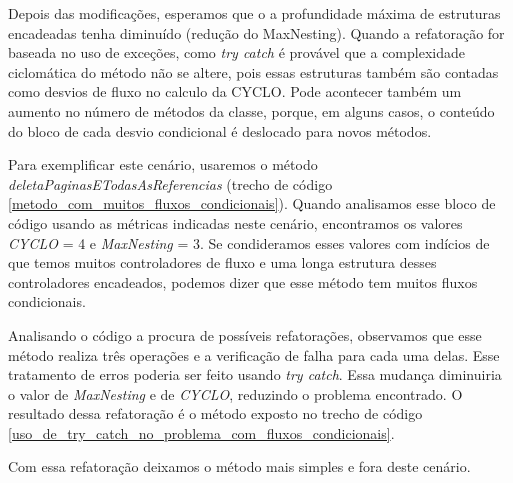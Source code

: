 Depois das modificações, esperamos que o a profundidade máxima de estruturas encadeadas tenha diminuído (redução do MaxNesting). Quando a refatoração for baseada no uso de exceções, como \textit{try catch} é provável que a complexidade ciclomática do método não se altere, pois essas estruturas também são contadas como desvios de fluxo no calculo da CYCLO. Pode acontecer também um aumento no número de métodos da classe, porque, em alguns casos, o conteúdo do bloco de cada desvio condicional é deslocado para novos métodos. 
           
Para exemplificar este cenário, usaremos o método \textit{deletaPaginasETodasAsReferencias} (trecho de código \ref{metodo_com_muitos_fluxos_condicionais}). Quando analisamos esse bloco de código usando as métricas indicadas neste cenário, encontramos os valores \textit{CYCLO} = 4 e \textit{MaxNesting} = 3. Se condideramos esses valores com indícios de que temos muitos controladores de fluxo e uma longa estrutura desses controladores encadeados, podemos dizer que esse método tem muitos fluxos condicionais. 
                                                                                          
               
                                                                                          
Analisando o código a procura de possíveis refatorações, observamos que esse método realiza três operações e a verificação de falha para cada uma delas. Esse tratamento de erros poderia ser feito usando \textit{try catch}. Essa mudança diminuiria o valor de \textit{MaxNesting} e de \textit{CYCLO}, reduzindo o problema encontrado. O resultado dessa refatoração é o método exposto no trecho de código \ref{uso_de_try_catch_no_problema_com_fluxos_condicionais}.
                                                         

              
Com essa refatoração deixamos o método mais simples e fora deste cenário.


